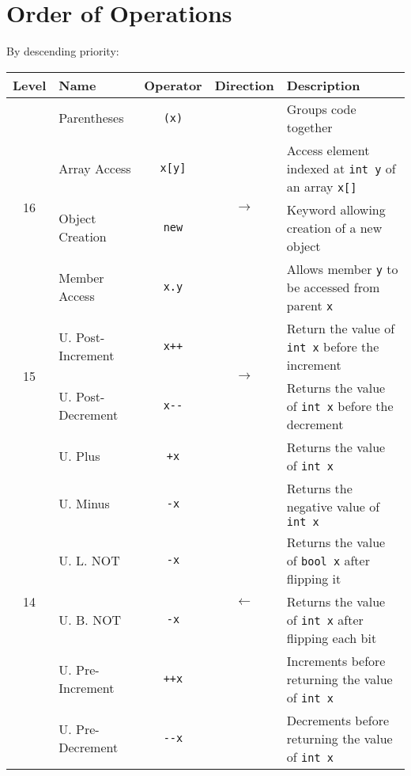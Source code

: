 \documentclass[11pt]{article}
\begin{document}
\section{Order of Operations} %
By descending priority: 
\begin{center}\begin{tabularx}{\textwidth}{clccX}\toprule
  Level               & \quad Name        & Operator          & Direction & \qquad Description \\\midrule
  \multirow{4}{*}{16} & Parentheses       & \lstinline|(x)|   & \multirow{4}{*}{\(\rightarrow\)}& Groups code together \\
                      & Array Access      & \lstinline|x[y]|  & & Access element indexed at \lstinline|int y| of an array \lstinline|x[]|\\
                      & Object Creation   & \lstinline|new|   & & Keyword allowing creation of a new object\\
                      & Member Access     & \lstinline|x.y|   & & Allows member \lstinline|y| to be accessed from parent \lstinline|x| \\ \midrule
  \multirow{2}{*}{15} & U. Post-Increment & \lstinline|x++|   & \multirow{2}{*}{\(\rightarrow\)} & Return the value of \lstinline|int x| before the increment \\
                      & U. Post-Decrement & \lstinline|x--|   & & Returns the value of \lstinline|int x| before the decrement\\\midrule
  \multirow{6}{*}{14} & U. Plus           & \lstinline|+x|    & \multirow{6}{*}{\(\leftarrow\)} & Returns the value of \lstinline|int x|\\
                      & U. Minus          & \lstinline|-x|    & & Returns the negative value of \lstinline|int x| \\
                      & U. L. NOT         & \lstinline|-x|    & & Returns the value of \lstinline|bool x| after flipping it \\
                      & U. B. NOT         & \lstinline|-x|    & & Returns the value of \lstinline|int x| after flipping each bit\\
                      & U. Pre-Increment  & \lstinline|++x|   & & Increments before returning the value of \lstinline|int x| \\
                      & U. Pre-Decrement  & \lstinline|--x|   & & Decrements before returning the value of \lstinline|int x| \\\midrule

\end{tabularx}
\end{center}
\end{document}
